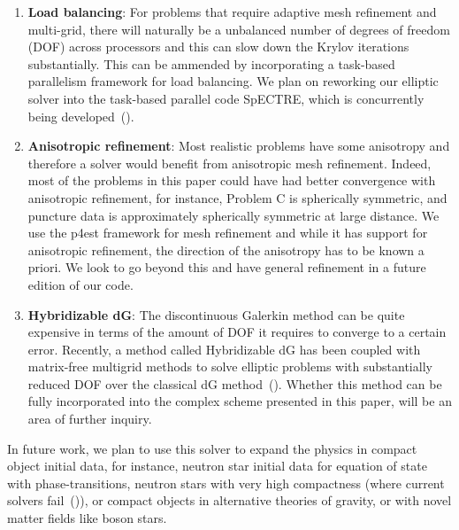 \begin{enumerate}
\item {\bf Load balancing}: For problems that require adaptive mesh
  refinement and multi-grid, there will naturally be a unbalanced
  number of degrees of freedom (DOF) across processors and this can
  slow down the Krylov iterations substantially. This can be ammended
  by incorporating a task-based parallelism framework for load
  balancing.  We plan on reworking our elliptic solver into the
  task-based parallel code SpECTRE, which is concurrently being developed~(\cite{kidder:16}).
\item {\bf Anisotropic refinement}: Most realistic problems have some
  anisotropy and therefore a solver would benefit from anisotropic
  mesh refinement.  Indeed, most of the problems in this paper could
  have had better convergence with anisotropic refinement, for instance, Problem C is spherically symmetric, and puncture data is approximately spherically symmetric at large distance.  We use the
  p4est framework for mesh refinement and while it has support for
  anisotropic refinement, the direction of the anisotropy has to be
  known a priori. We look to go beyond this and have general
  refinement in a future edition of our code.
\item {\bf Hybridizable dG}: The discontinuous Galerkin method can be quite
  expensive in terms of the amount of DOF it requires to converge to a
  certain error. Recently, a method called Hybridizable dG has been
  coupled with matrix-free multigrid methods to solve elliptic
  problems with substantially reduced DOF over the classical dG
  method~(\cite{fabien2019manycore,muralikrishnan2019multilevel}). Whether
  this method can be fully incorporated into the complex scheme
  presented in this paper, will be an area of further inquiry.
\end{enumerate}

In future work, we plan to use this solver to expand the physics in
compact object initial data, for instance, neutron star initial data
for equation of state with phase-transitions, neutron stars with
very high compactness (where current solvers fail~(\cite{henriksson:2014tba})),
or compact objects in alternative theories of gravity, or with novel matter fields like boson stars.



